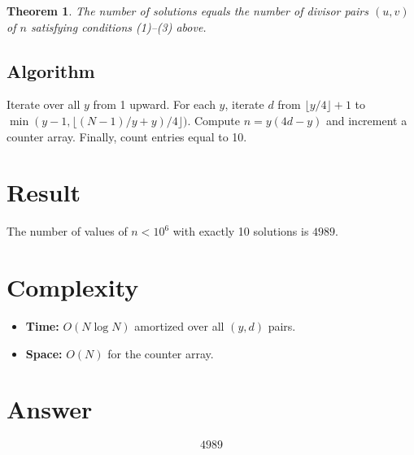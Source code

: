 \documentclass[12pt]{article}
\newtheorem{theorem}{Theorem}
\begin{document}
\begin{theorem}
The number of solutions equals the number of divisor pairs $(u, v)$ of $n$ satisfying conditions (1)--(3) above.
\end{theorem}

\subsection{Algorithm}
Iterate over all $y$ from 1 upward. For each $y$, iterate $d$ from $\lfloor y/4 \rfloor + 1$ to $\min(y-1, \lfloor(N-1)/y + y)/4\rfloor)$. Compute $n = y(4d - y)$ and increment a counter array. Finally, count entries equal to 10.

\section{Result}
The number of values of $n < 10^6$ with exactly 10 solutions is $\boxed{4989}$.

\section{Complexity}
\begin{itemize}
    \item \textbf{Time:} $O(N \log N)$ amortized over all $(y, d)$ pairs.
    \item \textbf{Space:} $O(N)$ for the counter array.
\end{itemize}

\section{Answer}

\[
\boxed{4989}
\]
\end{document}
